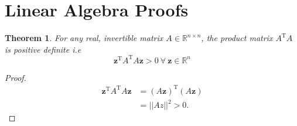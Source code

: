 \documentclass[10pt,a4paper, twocolumn, conference]{IEEEtran}
\theoremstyle{own}
\theoremstyle{definition}
\theoremstyle{plain}
\newtheorem{thm}{Theorem}
\begin{document}
\pagebreak
\appendix
\section{Linear Algebra Proofs}
\begin{thm} \label{posdef}
For any real, invertible matrix $A \in \mathbb{R}^{n \times n}$, the product matrix $A^{\text{T}}A$ is positive definite i.e
\begin{equation}
\mathbf{z}^{\text{T}} A^{\text{T}}A \mathbf{z} > 0 ~ \forall ~ \mathbf{z} \in \mathbb{R}^{n}
\end{equation}
\end{thm}
\begin{proof}
\begin{align} \nonumber
\mathbf{z}^{\text{T}} A^{\text{T}}A \mathbf{z} & = (A \mathbf{z})^{\text{T}} (A \mathbf{z}) \\
& = || Az ||^2 > 0.
\end{align}
\end{proof}














 
\end{document}
